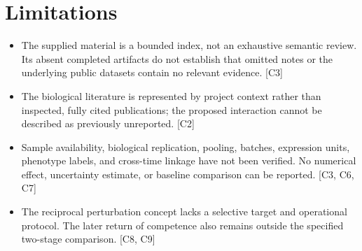 \documentclass[11pt]{article}
\begin{document}
\section{Limitations}
\begin{itemize}
\item The supplied material is a bounded index, not an exhaustive semantic review. Its absent completed artifacts do not establish that omitted notes or the underlying public datasets contain no relevant evidence. [C3]
\item The biological literature is represented by project context rather than inspected, fully cited publications; the proposed interaction cannot be described as previously unreported. [C2]
\item Sample availability, biological replication, pooling, batches, expression units, phenotype labels, and cross-time linkage have not been verified. No numerical effect, uncertainty estimate, or baseline comparison can be reported. [C3, C6, C7]
\item The reciprocal perturbation concept lacks a selective target and operational protocol. The later return of competence also remains outside the specified two-stage comparison. [C8, C9]
\end{itemize}
\end{document}
